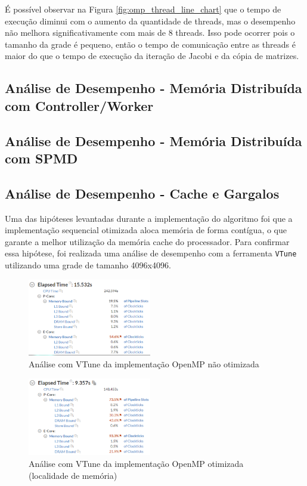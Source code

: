\documentclass[conference]{IEEEtran}
\begin{document}
É possível observar na Figura \ref{fig:omp_thread_line_chart} que o tempo de execução diminui com o aumento da quantidade de threads, mas o desempenho não melhora significativamente com mais de 8 threads. Isso pode ocorrer pois o tamanho da grade é pequeno, então o tempo de comunicação entre as threads é maior do que o tempo de execução da iteração de Jacobi e da cópia de matrizes.

\subsection{Análise de Desempenho - Memória Distribuída com Controller/Worker}

\subsection{Análise de Desempenho - Memória Distribuída com SPMD}

\subsection{Análise de Desempenho - Cache e Gargalos}

Uma das hipóteses levantadas durante a implementação do algoritmo foi que a implementação sequencial otimizada aloca memória de forma contígua, o que garante a melhor utilização da memória cache do processador. Para confirmar essa hipótese, foi realizada uma análise de desempenho com a ferramenta \texttt{VTune} utilizando uma grade de tamanho 4096x4096.

\begin{figure}[H]
    \centering
    \includegraphics[width=0.48\textwidth]{images/seq_og_vtune_cache.png}
    \caption{Análise com VTune da implementação OpenMP não otimizada}
    \label{fig:seq_og_vtune_cache}
\end{figure}

\begin{figure}[H]
    \centering
    \includegraphics[width=0.48\textwidth]{images/seq_opt_vtune_cache.png}
    \caption{Análise com VTune da implementação OpenMP otimizada (localidade de memória)}
    \label{fig:seq_opt_vtune_cache}
\end{figure}
\end{document}
